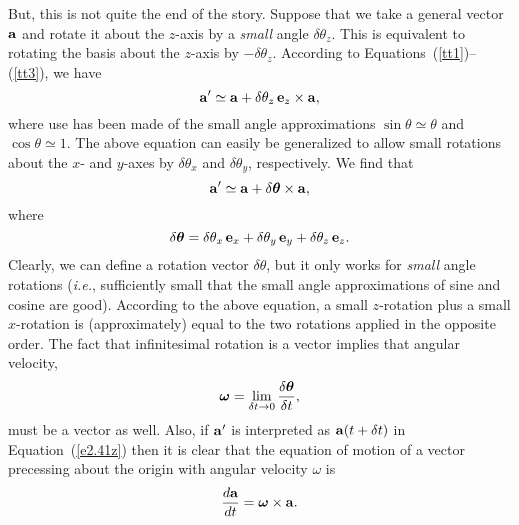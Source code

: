 But, this is not quite the end of the story. Suppose that we take a general vector
$\bf a$ and rotate it about the $z$-axis by a {\em small} angle $\delta \theta_z$.
This is equivalent to rotating the basis about the $z$-axis by $-\delta\theta_z$.
According to Equations~(\ref{tt1})--(\ref{tt3}), we have
\begin{equation}
{\bf a}' \simeq {\bf a} +\delta\theta_z \,{\bf e}_z\times {\bf a},
\end{equation}
where use has been made of the small angle approximations $\sin\theta \simeq \theta$
and $\cos\theta\simeq 1$. The above equation can easily be generalized to allow
small rotations about the $x$- and $y$-axes by $\delta \theta_x$ and $\delta\theta_y$,
respectively. We find that
\begin{equation}\label{e2.41z}
{\bf a}' \simeq {\bf a} + \delta \mbox{\boldmath$\theta$}\times {\bf a},
\end{equation}
where
\begin{equation}
\delta\mbox{\boldmath$\theta$} = \delta\theta_x \,{\bf e}_x + \delta\theta_y \,{\bf e}_y + 
 \delta\theta_z \,{\bf e}_z.
\end{equation}
Clearly, we can define a rotation vector \mbox{$\delta$\boldmath$\theta$}, but it only
works for {\em small} angle rotations ({\em i.e.}, sufficiently small that the small
angle approximations of sine and cosine are good). According to the above equation,
a small $z$-rotation plus a small $x$-rotation is (approximately) equal to 
the two rotations applied in the opposite order. 
The fact that infinitesimal rotation is a vector implies that angular velocity,
\begin{equation}
\mbox{\boldmath$\omega$} = \lim_{\delta t\rightarrow 0} \frac{\delta 
\mbox{\boldmath$\theta$} }{\delta t},
\end{equation}
must be a vector as well. Also, if ${\bf a}'$ is interpreted as ${\bf a}(t+\delta t)$
in Equation~(\ref{e2.41z}) then it is clear that the equation of motion of a vector
precessing about the origin with angular velocity \mbox{\boldmath$\omega$} is
\begin{equation}
\frac{d {\bf a}}{dt} = \mbox{\boldmath$\omega$}\times {\bf a}.\label{e239}
\end{equation}

